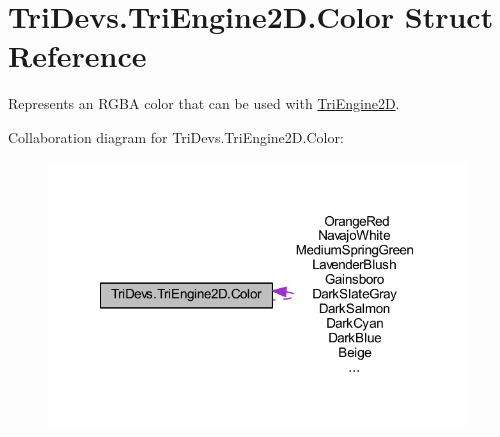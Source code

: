\hypertarget{struct_tri_devs_1_1_tri_engine2_d_1_1_color}{\section{Tri\-Devs.\-Tri\-Engine2\-D.\-Color Struct Reference}
\label{struct_tri_devs_1_1_tri_engine2_d_1_1_color}
}


Represents an R\-G\-B\-A color that can be used with \hyperlink{namespace_tri_devs_1_1_tri_engine2_d}{Tri\-Engine2\-D}.  




Collaboration diagram for Tri\-Devs.\-Tri\-Engine2\-D.\-Color\-:\nopagebreak
\begin{figure}[H]
\begin{center}
\leavevmode
\includegraphics[width=315pt]{struct_tri_devs_1_1_tri_engine2_d_1_1_color__coll__graph}
\end{center}
\end{figure}

